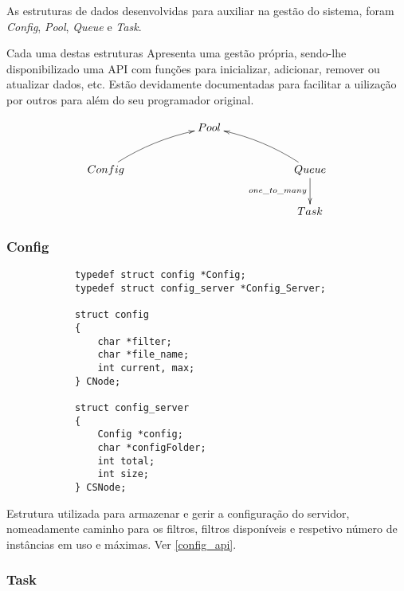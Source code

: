 \documentclass{article}
\begin{document}
As estruturas de dados desenvolvidas para auxiliar na gestão do sistema, foram \textit{Config}, \textit{Pool}, \textit{Queue} e \textit{Task}.

Cada uma destas estruturas Apresenta uma gestão própria, sendo-lhe disponibilizado uma API com funções para inicializar, adicionar,
remover ou atualizar dados, etc. Estão devidamente documentadas para facilitar a uilização por outros para além do seu programador
original.

\begin{equation*}
    \xymatrixcolsep{5pc}\xymatrix {
    & Pool \\
    Config\ar@/^/[ur] & & Queue\ar@/_/[ul]\ar[d]_{one\_to\_many} \\
    & & Task
    }
\end{equation*}

\subsubsection{Config}

\begin{verbatim}
            typedef struct config *Config;
            typedef struct config_server *Config_Server;
            
            struct config
            {
                char *filter;
                char *file_name;
                int current, max;
            } CNode;

            struct config_server
            {
                Config *config;
                char *configFolder;
                int total;
                int size;
            } CSNode;

			\end{verbatim}

Estrutura utilizada para armazenar e gerir a configuração do servidor, nomeadamente caminho para os filtros,
filtros disponíveis e respetivo número de instâncias em uso e máximas. Ver \ref{config_api}.

\subsubsection{Task}
\end{document}
